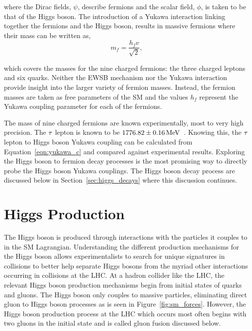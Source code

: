 where the Dirac fields, $\psi$, describe fermions and the scalar field, $\phi$, is taken to be that of the Higgs boson. 
The introduction of a Yukawa interaction linking together the fermions and the Higgs boson,
results in massive fermions where their mass can be written as,
\begin{equation}
m_{f} = \frac{h_{f} v}{\sqrt{2}},
\label{eqn:yukawa_c}
\end{equation}

which covers the masses for the nine charged fermions: the three charged leptons and six quarks.
Neither the EWSB mechanism nor the Yukawa interaction provide insight into the larger variety of fermion
masses. Instead, the fermion masses are taken as free parameters of the SM and the values
$h_{f}$ represent the Yukawa coupling parameter for each of the fermions.

The mass of nine charged fermions are known experimentally, most to very high precision.
The $\tau$ lepton is known to be $1776.82\pm0.16\,\mathrm{MeV}$~\cite{PDG}.
Knowing this, the $\tau$ lepton to Higgs boson Yukawa coupling can be calculated from 
Equation~\ref{eqn:yukawa_c} and compared against experimental results. 
Exploring the Higgs boson to fermion decay processes is the most promising way to directly probe
the Higgs boson Yukawa couplings. The Higgs boson decay process are discussed below in 
Section~\ref{sec:higgs_decays} where this discussion continues.




\section{Higgs Production}
\label{sec:higgs_production}
The Higgs boson is produced through interactions with the particles it couples to in the SM
Lagrangian. Understanding the different production mechanisms for the Higgs boson
allows experimentalists to search for unique signatures in collisions to better
help separate Higgs bosons from the myriad other interactions occurring in collisions at the LHC.
At a hadron collider like the LHC, the relevant Higgs boson production
mechanisms begin from initial states of quarks and gluons. The Higgs boson
only couples to massive particles, eliminating direct gluon to Higgs boson processes
as is seen in Figure~\ref{fig:sm_forces}.
However, the Higgs boson production process at the LHC which occurs most often
begins with two gluons in the initial state and is called gluon fusion discussed below.

